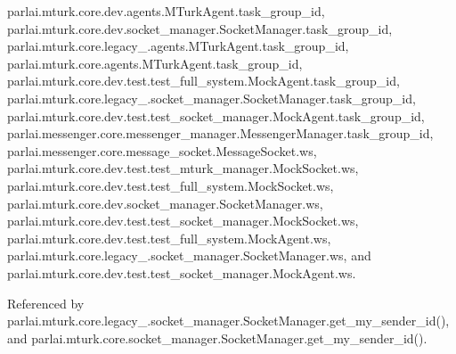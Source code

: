parlai.\+mturk.\+core.\+dev.\+agents.\+M\+Turk\+Agent.\+task\+\_\+group\+\_\+id, parlai.\+mturk.\+core.\+dev.\+socket\+\_\+manager.\+Socket\+Manager.\+task\+\_\+group\+\_\+id, parlai.\+mturk.\+core.\+legacy\+\_.\+agents.\+M\+Turk\+Agent.\+task\+\_\+group\+\_\+id, parlai.\+mturk.\+core.\+agents.\+M\+Turk\+Agent.\+task\+\_\+group\+\_\+id, parlai.\+mturk.\+core.\+dev.\+test.\+test\+\_\+full\+\_\+system.\+Mock\+Agent.\+task\+\_\+group\+\_\+id, parlai.\+mturk.\+core.\+legacy\+\_.\+socket\+\_\+manager.\+Socket\+Manager.\+task\+\_\+group\+\_\+id, parlai.\+mturk.\+core.\+dev.\+test.\+test\+\_\+socket\+\_\+manager.\+Mock\+Agent.\+task\+\_\+group\+\_\+id, parlai.\+messenger.\+core.\+messenger\+\_\+manager.\+Messenger\+Manager.\+task\+\_\+group\+\_\+id, parlai.\+messenger.\+core.\+message\+\_\+socket.\+Message\+Socket.\+ws, parlai.\+mturk.\+core.\+dev.\+test.\+test\+\_\+mturk\+\_\+manager.\+Mock\+Socket.\+ws, parlai.\+mturk.\+core.\+dev.\+test.\+test\+\_\+full\+\_\+system.\+Mock\+Socket.\+ws, parlai.\+mturk.\+core.\+dev.\+socket\+\_\+manager.\+Socket\+Manager.\+ws, parlai.\+mturk.\+core.\+dev.\+test.\+test\+\_\+socket\+\_\+manager.\+Mock\+Socket.\+ws, parlai.\+mturk.\+core.\+dev.\+test.\+test\+\_\+full\+\_\+system.\+Mock\+Agent.\+ws, parlai.\+mturk.\+core.\+legacy\+\_.\+socket\+\_\+manager.\+Socket\+Manager.\+ws, and parlai.\+mturk.\+core.\+dev.\+test.\+test\+\_\+socket\+\_\+manager.\+Mock\+Agent.\+ws.



Referenced by parlai.\+mturk.\+core.\+legacy\+\_.\+socket\+\_\+manager.\+Socket\+Manager.\+get\+\_\+my\+\_\+sender\+\_\+id(), and parlai.\+mturk.\+core.\+socket\+\_\+manager.\+Socket\+Manager.\+get\+\_\+my\+\_\+sender\+\_\+id().

